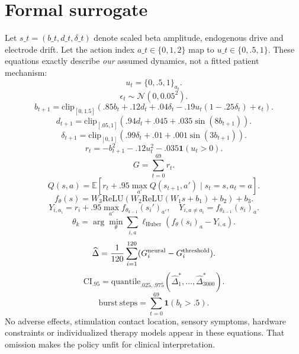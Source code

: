 \section{Formal surrogate}
Let $s\_t=(b\_t,d\_t,\delta\_t)$ denote scaled beta amplitude, endogenous drive and electrode drift. Let the action index $a\_t\in\{0,1,2\}$ map to $u\_t\in\{0,.5,1\}$. These equations exactly describe \emph{our} assumed dynamics, not a fitted patient mechanism:
\begin{equation}u_t=\{0,.5,1\}_{a_t}.\end{equation}
\begin{equation}\epsilon_t\sim\mathcal N(0,0.05^2).\end{equation}
\begin{equation}b_{t+1}=\mathrm{clip}_{[0,1.5]}(.85b_t+.12d_t+.04\delta_t-.19u_t(1-.25\delta_t)+\epsilon_t).\end{equation}
\begin{equation}d_{t+1}=\mathrm{clip}_{[.05,1]}(.94d_t+.045+.035\sin(8b_{t+1})).\end{equation}
\begin{equation}\delta_{t+1}=\mathrm{clip}_{[0,1]}(.99\delta_t+.01+.001\sin(3b_{t+1})).\end{equation}
\begin{equation}r_t=-b_{t+1}^2-.12u_t^2-.035\mathbf 1(u_t>0).\end{equation}
\begin{equation}G=\sum_{t=0}^{69}r_t.\end{equation}
\begin{equation}Q(s,a)=\mathbb E[r_t+.95\max_{a'}Q(s_{t+1},a')\mid s_t=s,a_t=a].\end{equation}
\begin{equation}f_\theta(s)=W_3\mathrm{ReLU}(W_2\mathrm{ReLU}(W_1s+b_1)+b_2)+b_3.\end{equation}
\begin{equation}Y_{i,a_i}=r_i+.95\max_{a'}f_{\theta_{k-1}}(s_i')_{a'},\quad Y_{i,a\ne a_i}=f_{\theta_{k-1}}(s_i)_a.\end{equation}
\begin{equation}\theta_k=\arg\min_\theta\sum_{i,a}\ell_{\mathrm{Huber}}(f_\theta(s_i)_a-Y_{i,a}).\end{equation}
\begin{equation}\widehat\Delta=\frac1{120}\sum_{i=1}^{120}(G_i^{\rm neural}-G_i^{\rm threshold}).\end{equation}
\begin{equation}\mathrm{CI}_{.95}=\mathrm{quantile}_{.025,.975}(\widehat\Delta^{*}_1,\ldots,\widehat\Delta^{*}_{3000}).\end{equation}
\begin{equation}\mathrm{burst\ steps}=\sum_{t=0}^{69}\mathbf 1(b_t>.5).\end{equation}
No adverse effects, stimulation contact location, sensory symptoms, hardware constraints or individualized therapy models appear in these equations. That omission makes the policy unfit for clinical interpretation.
